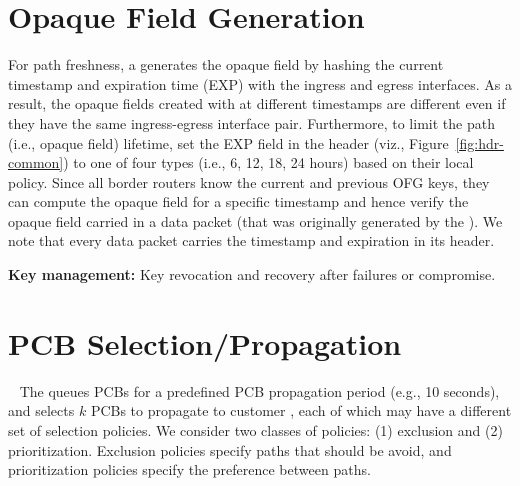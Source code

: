 \section{Opaque Field Generation}
For path freshness, a \BS generates the opaque field by hashing the current timestamp and expiration time (EXP) with the ingress and egress interfaces. As a result, the opaque fields created with at different timestamps are different even if they have the same ingress-egress interface pair. Furthermore, to limit the path (i.e., opaque field) lifetime, \BSs set the EXP field in the header (viz., Figure~\ref{fig:hdr-common}) to one of four types (i.e., 6, 12, 18, 24 hours) based on their local policy. Since all border routers know the current and previous OFG keys, they can compute the opaque field for a specific timestamp and hence verify the opaque field carried in a data packet (that was originally generated by the \BS). We note that every data packet carries the timestamp and expiration in its header. %

{\bf Key management:} Key revocation and recovery after failures or compromise. 

\section{PCB Selection/Propagation}~\label{subsec:pcb_selection}
The \BS queues PCBs for a predefined PCB propagation period (e.g., 10
seconds), and selects $k$ PCBs to propagate to customer \ADs, each of
which may have a different set of selection policies. We consider two
classes of policies: (1) exclusion and (2) prioritization. Exclusion
policies specify paths that should be avoid, and prioritization
policies specify the preference between paths.

